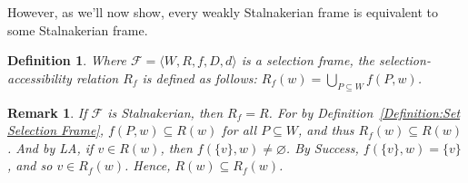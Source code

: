 \documentclass[12pt]{article}
\newtheorem{corollary}{Corollary}
\newtheorem{definition}{Definition}
\newtheorem{remark}{Remark}
\newcommand{\tup}[1]{\langle #1 \rangle}
\begin{document}


However, as we'll now show, every weakly Stalnakerian frame is equivalent to some Stalnakerian frame. 

\begin{definition}
    Where $\mathcal{F} = \tup{W,R,f,D,d}$ is a selection frame, the \emph{selection-accessibility} relation $R_f$ is defined as follows: $R_f(w) = \bigcup_{P \subseteq W}f(P,w)$. 
\end{definition}

\begin{remark}
    If $\mathcal{F}$ is Stalnakerian, then $R_f = R$. 
    For by Definition~\ref{Definition:Set Selection Frame}, $f(P,w) \subseteq R(w)$ for all $P \subseteq W$, and thus $R_f(w) \subseteq R(w)$. 
    And by LA, if $v \in R(w)$, then $f(\{v\},w) \neq \varnothing$. 
    By Success, $f(\{v\},w) = \{v\}$, and so $v \in R_f(w)$. 
    Hence, $R(w) \subseteq R_f(w)$. 
\end{remark}
\end{document}
